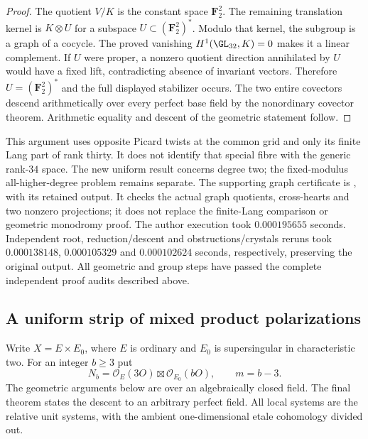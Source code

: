 \begin{proof}
The quotient $V/K$ is the constant space $\mathbf F_2^2$.
The remaining translation kernel is $K\otimes U$ for a
subspace $U\subset(\mathbf F_2^2)^*$. Modulo that kernel,
the subgroup is a graph of a cocycle. The proved vanishing
$H^1(\GL_{32},K)=0$ makes it a linear complement. If $U$
were proper, a nonzero quotient direction annihilated by
$U$ would have a fixed lift, contradicting absence of
invariant vectors. Therefore $U=(\mathbf F_2^2)^*$ and
the full displayed stabilizer occurs. The two entire
covectors descend arithmetically over every perfect base
field by the nonordinary covector theorem. Arithmetic
equality and descent of the geometric statement follow.
\end{proof}

\begin{remark}
\label{rem:mixed-degree-two-wreath-grid-scope-candidate}
This argument uses opposite Picard twists at the common grid
and only its finite Lang part of rank thirty. It does not
identify that special fibre with the generic rank-$34$ space.
The new uniform result concerns degree two; the fixed-modulus
all-higher-degree problem remains separate. The supporting graph
certificate is
,
with its retained output. It checks the actual graph quotients,
cross-hearts and two nonzero projections; it does not replace
the finite-Lang comparison or geometric monodromy proof.
The author execution took $0.000195655$ seconds. Independent
root, reduction/descent and obstructions/crystals reruns took
$0.000138148$, $0.000105329$ and $0.000102624$ seconds,
respectively, preserving the original output. All geometric and
group steps have passed the complete
independent proof audits described above.
\end{remark}


\subsection{A uniform strip of mixed product polarizations}
\label{subsec:mixed-three-by-b-strip-candidate}

Write $X=E\times E_0$, where $E$ is ordinary and $E_0$ is
supersingular in characteristic two. For an integer $b\ge3$ put
\[
 N_b=\mathcal O_E(3O)\boxtimes\mathcal O_{E_0}(bO),\qquad m=b-3.
\]
The geometric arguments below are over an algebraically closed field.
The final theorem states the descent to an arbitrary perfect field.
All local systems are the relative unit systems, with the ambient
one-dimensional etale cohomology divided out.

